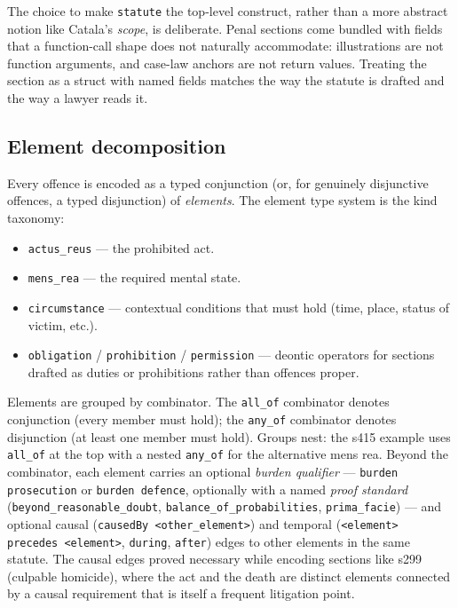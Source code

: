 The choice to make \texttt{statute} the top-level construct, rather than
a more abstract notion like Catala's \emph{scope}, is deliberate. Penal
sections come bundled with fields that a function-call shape does not
naturally accommodate: illustrations are not function arguments, and
case-law anchors are not return values. Treating the section as a struct
with named fields matches the way the statute is drafted and the way a
lawyer reads it.

\subsection{Element decomposition}
\label{subsec:elements}
Every offence is encoded as a typed conjunction (or, for genuinely
disjunctive offences, a typed disjunction) of \emph{elements}. The element
type system is the kind taxonomy:

\begin{itemize}
\item \texttt{actus\_reus} --- the prohibited act.
\item \texttt{mens\_rea} --- the required mental state.
\item \texttt{circumstance} --- contextual conditions that must hold
(time, place, status of victim, etc.).
\item \texttt{obligation} / \texttt{prohibition} / \texttt{permission}
--- deontic operators for sections drafted as duties or
prohibitions rather than offences proper.
\end{itemize}

Elements are grouped by combinator. The \texttt{all\_of} combinator
denotes conjunction (every member must hold); the \texttt{any\_of}
combinator denotes disjunction (at least one member must hold). Groups
nest: the s415 example uses \texttt{all\_of} at the top with a nested
\texttt{any\_of} for the alternative mens rea. Beyond the combinator,
each element carries an optional \emph{burden qualifier} ---
\texttt{burden prosecution} or \texttt{burden defence}, optionally with
a named \emph{proof standard} (\texttt{beyond\_reasonable\_doubt},
\texttt{balance\_of\_probabilities}, \texttt{prima\_facie}) --- and
optional causal (\texttt{causedBy <other\_element>}) and temporal
(\texttt{<element> precedes <element>}, \texttt{during}, \texttt{after})
edges to other elements in the same statute. The causal edges proved
necessary while encoding sections like s299 (culpable homicide), where
the act and the death are distinct elements connected by a causal
requirement that is itself a frequent litigation point.


